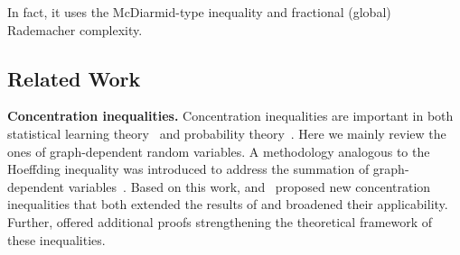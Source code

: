 \documentclass{article}
\begin{document}
\begin{table}[t]
\begin{small}
\begin{threeparttable}
\begin{tablenotes}
    \item[1] In fact, it uses the McDiarmid-type inequality and fractional (global) Rademacher complexity.
\end{tablenotes}
\end{threeparttable}
\end{small}
\end{table}

\subsection{Related Work}
\textbf{Concentration inequalities.}
Concentration inequalities \cite{concentration13initial} are important in both statistical learning theory~\cite{statistics97} and probability theory~\cite{07probability}. Here we mainly review the ones of graph-dependent random variables. A methodology analogous to the Hoeffding inequality was introduced to address the summation of graph-dependent variables~\cite{jason04}. Based on this work, \cite{usunier2005generalization} and~\cite{ralaivola2015entropy} proposed new concentration inequalities that both extended the results of \cite{jason04} and broadened their applicability. Further, \cite{ruiray22} offered additional proofs strengthening the theoretical framework of these inequalities. 
\end{document}
